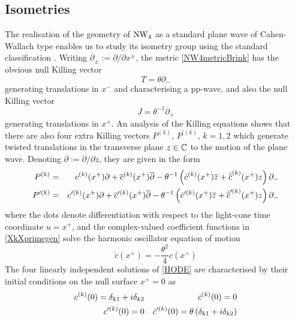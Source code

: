 \subsection{Isometries}
\label{Isoms}
The realisation of the geometry of $\operatorname{NW}_4$ as a standard plane wave of
Cahen-Wallach type enables us to study its isometry group using the standard
classification \cite{BOL1}. Writing $\partial_\pm := \partial/\partial x^\pm$,
the metric \eqref{NW4metricBrink} has the obvious null Killing vector
\begin{equation}
  \label{ZKilling}
  T=\theta \partial_-
\end{equation}
generating translations in $x^-$ and characterising a pp-wave, and also the null
Killing vector
\begin{equation}
  \label{HKilling}
  J=\theta^{-1} \partial_+
\end{equation}
generating translations in $x^+$. An analysis of the Killing equations
\cite{BOL1} shows that there are also four extra Killing vectors $P^{(k)}$,
$P^{\prime (k)}$, $k=1,2$ which generate twisted translations in the transverse
plane $z\in{\mathbb C}$ to the motion of the plane wave. Denoting
$\partial:=\partial/\partial z$, they are given in the form
\begin{eqnarray}
  \label{XkXprimegen}
  P^{(k)}&=&c^{(k)}(x^+) \partial+\overline{c}^{ (k)}(x^+) 
  \overline{\partial}-\theta^{-1} \left(\dot c^{(k)}(x^+) \overline{z}+
    \dot{\overline{c}}^{ (k)}(x^+) z\right) \partial_- \nonumber\\
  P^{\prime (k)}&=&c^{\prime (k)}(x^+) \partial+\overline{c}^{ 
    \prime (k)}(x^+) 
  \overline{\partial}-\theta^{-1} \left(\dot c^{\prime (k)}(x^+) \overline{z}+
    \dot{\overline{c}}^{ \prime (k)}(x^+) z\right) \partial_-  
\end{eqnarray}
where the dots denote differentiation with respect to the light-cone time
coordinate $u=x^+$, and the complex-valued coefficient functions in
\eqref{XkXprimegen} solve the harmonic oscillator equation of motion
\begin{equation}
  \label{HODE}
  \dot c(x^+)=-\frac{\theta^2}4 c(x^+)  
\end{equation}
The four linearly independent solutions of \eqref{HODE} are characterised by
their initial conditions on the null surface $x^+=0$ as
\begin{eqnarray}
  \label{cinitialconds}
  c^{(k)}(0) = \delta_{k1}+ i \delta_{k2} && \dot c^{(k)}(0) = 0\nonumber\\
  c^{\prime (k)}(0) = 0 && \dot c^{\prime (k)}(0) =
  \theta \left(\delta_{k1}+ i \delta_{k2}\right)  
\end{eqnarray}


